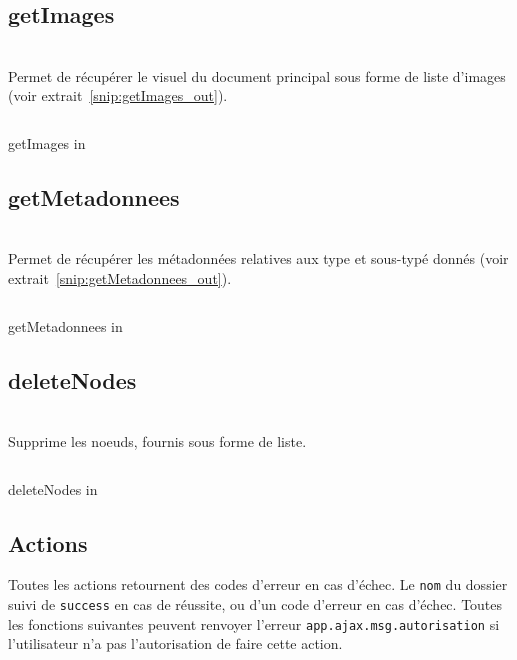 \subsection{getImages}
\\

Permet de récupérer le visuel du document principal sous forme de liste d'images (voir extrait~\ref{snip:getImages_out}).

\begin{codesnippet}
\inputminted[frame=single,linenos,fontsize=\footnotesize]{javascript}{extraits/getImages_in.js}
\caption{getImages in}
\label{snip:getImages_in}
\end{codesnippet}


\subsection{getMetadonnees}
\\

Permet de récupérer les métadonnées relatives aux type et sous-typé donnés (voir extrait~\ref{snip:getMetadonnees_out}).

\begin{codesnippet}
\inputminted[frame=single,linenos,fontsize=\footnotesize]{javascript}{extraits/getMetadonnees_in.js}
\caption{getMetadonnees in}
\label{snip:getMetadonnees_in}
\end{codesnippet}


\subsection{deleteNodes}
\\

Supprime les noeuds, fournis sous forme de liste.

\begin{codesnippet}
\inputminted[frame=single,linenos,fontsize=\footnotesize]{javascript}{extraits/deleteNodes_in.js}
\caption{deleteNodes in}
\label{snip:deleteNodes_in}
\end{codesnippet}


\subsection{Actions}

Toutes les actions retournent des codes d'erreur en cas d'échec. Le \verb|nom| du dossier suivi de \verb|success| en cas de réussite, ou d'un code d'erreur en cas d'échec.
Toutes les fonctions suivantes peuvent renvoyer l'erreur \verb|app.ajax.msg.autorisation| si l'utilisateur n'a pas l'autorisation de faire cette action.

